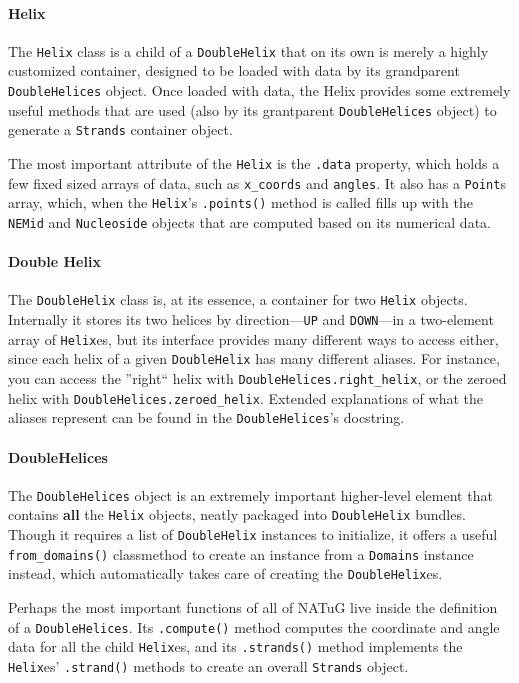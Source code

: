 \documentclass[titlepage]{article}
\begin{document}
	\paragraph{Helix}
	The \texttt{Helix} class is a child of a \texttt{DoubleHelix} that on its own is merely a highly customized container, designed to be loaded with data by its grandparent \texttt{DoubleHelices} object. Once loaded with data, the Helix provides some extremely useful methods that are used (also by its grantparent \texttt{DoubleHelices} object) to generate a \texttt{Strands} container object.
	
	The most important attribute of the \texttt{Helix} is the \texttt{.data} property, which holds a few fixed sized arrays of data, such as \texttt{x\_coords} and \texttt{angles}. It also has a \texttt{Point}s array, which, when the \texttt{Helix}'s \texttt{.points()} method is called fills up with the \texttt{NEMid} and \texttt{Nucleoside} objects that are computed based on its numerical data.
	
	\paragraph{Double Helix}
	The \texttt{DoubleHelix} class is, at its essence, a container for two \texttt{Helix} objects. Internally it stores its two helices by direction---\texttt{UP} and \texttt{DOWN}---in a two-element array of \texttt{Helix}es, but its interface provides many different ways to access either, since each helix of a given \texttt{DoubleHelix} has many different aliases. For instance, you can access the ''right`` helix with \texttt{DoubleHelices.right\_helix}, or the zeroed helix with \texttt{DoubleHelices.zeroed\_helix}. Extended explanations of what the aliases represent can be found in the \texttt{DoubleHelices}'s docstring.
	
	\paragraph{DoubleHelices}
	The \texttt{DoubleHelices} object is an extremely important higher-level element that contains \textbf{all} the \texttt{Helix} objects, neatly packaged into \texttt{DoubleHelix} bundles. Though it requires a list of \texttt{DoubleHelix} instances to initialize, it offers a useful \texttt{from\_domains()} classmethod to create an instance from a \texttt{Domains} instance instead, which automatically takes care of creating the \texttt{DoubleHelix}es.
	
	Perhaps the most important functions of all of NATuG live inside the definition of a \texttt{DoubleHelices}. Its \texttt{.compute()} method computes the coordinate and angle data for all the child \texttt{Helix}es, and its \texttt{.strands()} method implements the \texttt{Helix}es' \texttt{.strand()} methods to create an overall \texttt{Strands} object.
	
\end{document}
